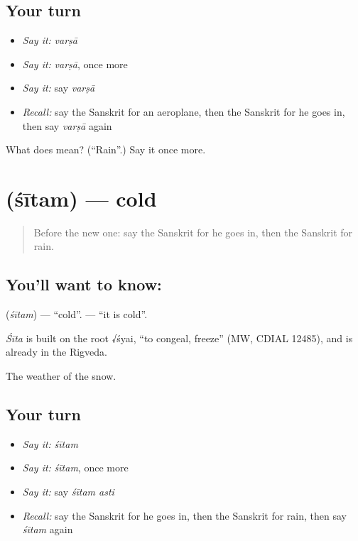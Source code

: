 \subsection*{Your turn}
\begin{itemize}
\raggedright
  \item \emph{Say it:} \emph{varṣā}
  \item \emph{Say it:} \emph{varṣā}, once more
  \item \emph{Say it:} say \emph{varṣā}
  \item \emph{Recall:} say the Sanskrit for an aeroplane, then the Sanskrit for he goes in, then say \emph{varṣā} again
\end{itemize}

\begin{tcolorbox}[breakable,colback=teal!4,colframe=teal!35!black,title={Before you move on}]
What does  mean? (\textquotedblleft{}Rain\textquotedblright{}.) Say it once more.
\end{tcolorbox}
\section[\texorpdfstring{\sk{शीतम्} (śītam)}{शीतम् (śītam)}]{ (śītam) — cold}

\label{lesson:SA-C76-cold}



\begin{quote}
Before the new one: say the Sanskrit for he goes in, then the Sanskrit for rain.
\end{quote}

\subsection*{You'll want to know: }
\textbf{} (\emph{śītam}) — \textquotedblleft{}cold\textquotedblright{}. \textbf{ } — \textquotedblleft{}it is cold\textquotedblright{}.

\begin{cousinweb}
\emph{Śīta} is built on the root √śyai, \textquotedblleft{}to congeal, freeze\textquotedblright{} (MW, CDIAL 12485), and is already in the Rigveda.
\end{cousinweb}

\begin{grammarlens}[title={What you've built}]
The weather of the snow.
\end{grammarlens}

\subsection*{Your turn}
\begin{itemize}
\raggedright
  \item \emph{Say it:} \emph{śītam}
  \item \emph{Say it:} \emph{śītam}, once more
  \item \emph{Say it:} say \emph{śītam asti}
  \item \emph{Recall:} say the Sanskrit for he goes in, then the Sanskrit for rain, then say \emph{śītam} again
\end{itemize}


